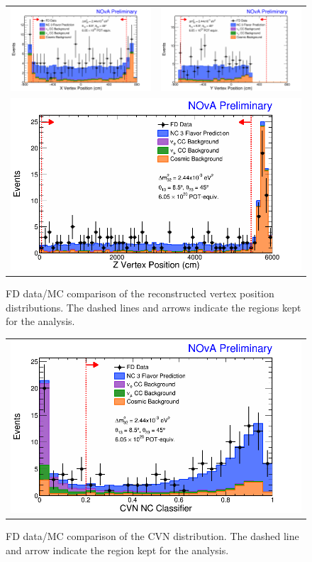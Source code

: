 \begin{figure}[htbp]
  \centering
  \begin{tabular}{c c}
    \includegraphics[width=.47\textwidth]{figures/FDDataMC/FDVtxXStack.png} &
    \includegraphics[width=.47\textwidth]{figures/FDDataMC/FDVtxYStack.png} \\
    \multicolumn{2}{c}{\includegraphics[width=.47\textwidth]{figures/FDDataMC/FDVtxZStack.png}} \\
  \end{tabular}
  \caption[FD Data/MC Comparison: Fiducial Variable Distributions]{FD data/MC comparison of the reconstructed vertex position distributions. The dashed lines and arrows indicate the regions kept for the analysis.}
  \label{fig:FDDataMCFidCont}
\end{figure}

\begin{figure}[htbp]
  \centering
  \begin{tabular}{c c}
    \multicolumn{2}{c}{\includegraphics[width=.47\textwidth]{figures/FDDataMC/FDCVNStack.png}} \\
  \end{tabular}
  \caption[FD Data/MC Comparison: CVN Distribution]{FD data/MC comparison of the CVN distribution. The dashed line and arrow indicate the region kept for the analysis.}
  \label{fig:FDDataMCNCSel}
\end{figure}

